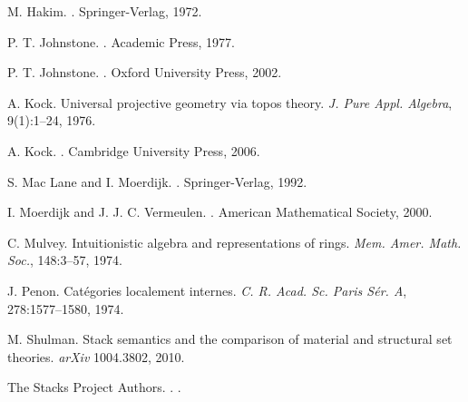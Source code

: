 \documentclass[10pt,utf8,notheorems,compress]{beamer}
\newcommand{\?}{\,{:}\,}
\renewcommand{\_}{\mathpunct{.}\,}
\begin{document}
{\begin{thebibliography}{18}
      M. Hakim.
      .
      \newblock Springer-Verlag, 1972.

      P. T. Johnstone.
      .
      \newblock Academic Press, 1977.

      P. T. Johnstone.
      .
      \newblock Oxford University Press, 2002.

      A. Kock.
      \newblock Universal projective geometry via topos theory.
      \newblock \emph{J. Pure Appl. Algebra}, 9(1):1--24, 1976.

      A. Kock.
      .
      \newblock Cambridge University Press, 2006.

      S. Mac Lane and I. Moerdijk.
      .
      \newblock Springer-Verlag, 1992.

      I. Moerdijk and J. J. C. Vermeulen.
      .
      \newblock American Mathematical Society, 2000.

      C. Mulvey.
      \newblock Intuitionistic algebra and representations of rings.
      \newblock \emph{Mem. Amer. Math. Soc.}, 148:3--57, 1974.

      J. Penon.
      \newblock Catégories localement internes.
      \newblock \emph{C. R. Acad. Sc. Paris Sér. A}, 278:1577--1580, 1974.

      M. Shulman.
      \newblock Stack semantics and the comparison of material and structural set theories.
      \newblock \emph{arXiv} 1004.3802, 2010.

      The Stacks Project Authors.
      .
      .


\end{thebibliography}}
\end{document}
